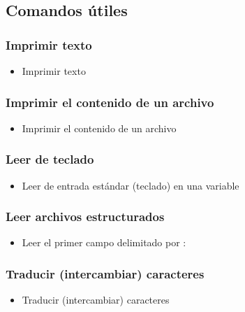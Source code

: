 \subsection{Comandos útiles}

\begin{frame}
  \frametitle{Imprimir texto}
  \begin{itemize}
    \item Imprimir texto
  \end{itemize}
\end{frame}

\begin{frame}
  \frametitle{Imprimir el contenido de un archivo}
  \begin{itemize}
    \item Imprimir el contenido de un archivo
  \end{itemize}
\end{frame}

\begin{frame}
  \frametitle{Leer de teclado}
  \begin{itemize}
    \item Leer de entrada estándar (teclado) en una variable
  \end{itemize}
\end{frame}

\begin{frame}
  \frametitle{Leer archivos estructurados}
  \begin{itemize}
    \item Leer el primer campo delimitado por :
  \end{itemize}
\end{frame}

\begin{frame}
  \frametitle{Traducir (intercambiar) caracteres}
  \begin{itemize}
    \item Traducir (intercambiar) caracteres
  \end{itemize}
\end{frame}

